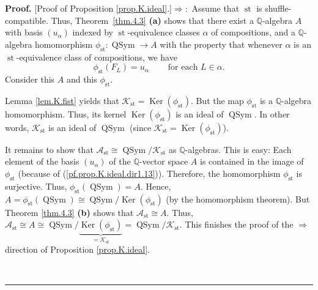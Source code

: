 \documentclass[numbers=enddot,12pt,final,onecolumn,notitlepage]{scrartcl}%
\theoremstyle{definition}
\newenvironment{proof}[1][Proof]{\noindent\textbf{#1.} }{\ \rule{0.5em}{0.5em}}
\newenvironment{verlong}{}{}
\begin{document}
\begin{verlong}
\begin{proof}
[Proof of Proposition \ref{prop.K.ideal}.]$\Longrightarrow:$ Assume that
$\operatorname*{st}$ is shuffle-compatible. Thus, Theorem~\ref{thm.4.3}
\textbf{(a)} shows that there exist a $\mathbb{Q}$-algebra $A$ with basis
$\left(  u_{\alpha}\right)  $ indexed by $\operatorname*{st}$-equivalence
classes $\alpha$ of compositions, and a $\mathbb{Q}$-algebra homomorphism
$\phi_{\operatorname*{st}}:\operatorname*{QSym}\rightarrow A$ with the
property that whenever $\alpha$ is an $\operatorname*{st}$-equivalence class
of compositions, we have%
\begin{equation}
\phi_{\operatorname*{st}}\left(  F_{L}\right)  =u_{\alpha}%
\ \ \ \ \ \ \ \ \ \ \text{for each }L\in\alpha.
\label{pf.prop.K.ideal.dir1.13}%
\end{equation}
Consider this $A$ and this $\phi_{\operatorname*{st}}$.

Lemma \ref{lem.K.fist} yields that $\mathcal{K}_{\operatorname*{st}%
}=\operatorname*{Ker}\left(  \phi_{\operatorname*{st}}\right)  $. But the map
$\phi_{\operatorname*{st}}$ is a $\mathbb{Q}$-algebra homomorphism. Thus, its
kernel $\operatorname*{Ker}\left(  \phi_{\operatorname*{st}}\right)  $ is an
ideal of $\operatorname*{QSym}$. In other words, $\mathcal{K}%
_{\operatorname*{st}}$ is an ideal of $\operatorname*{QSym}$ (since
$\mathcal{K}_{\operatorname*{st}}=\operatorname*{Ker}\left(  \phi
_{\operatorname*{st}}\right)  $).

It remains to show that $\mathcal{A}_{\operatorname*{st}}\cong%
\operatorname*{QSym}/\mathcal{K}_{\operatorname*{st}}$ as $\mathbb{Q}$-algebras.
This is easy: Each
element of the basis $\left(  u_{\alpha}\right)  $ of the $\mathbb{Q}$-vector
space $A$ is contained in the image of $\phi_{\operatorname*{st}}$ (because of
(\ref{pf.prop.K.ideal.dir1.13})). Therefore, the homomorphism $\phi
_{\operatorname*{st}}$ is surjective. Thus, $\phi_{\operatorname*{st}}\left(
\operatorname*{QSym}\right)  =A$. Hence, $A=\phi_{\operatorname*{st}}\left(
\operatorname*{QSym}\right)  \cong\operatorname*{QSym}/\operatorname*{Ker}%
\left(  \phi_{\operatorname*{st}}\right)  $ (by the homomorphism theorem). But
Theorem \ref{thm.4.3} \textbf{(b)} shows that $\mathcal{A}_{\operatorname*{st}%
}\cong A$. Thus, $\mathcal{A}_{\operatorname*{st}}\cong A\cong%
\operatorname*{QSym}/\underbrace{\operatorname*{Ker}\left(  \phi
_{\operatorname*{st}}\right)  }_{=\mathcal{K}_{\operatorname*{st}}%
}=\operatorname*{QSym}/\mathcal{K}_{\operatorname*{st}}$. This finishes the
proof of the $\Longrightarrow$ direction of Proposition \ref{prop.K.ideal}.


\end{proof}
\end{verlong}
\end{document}
